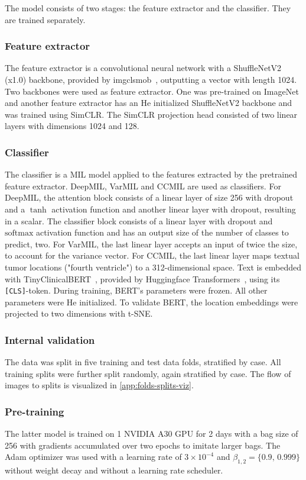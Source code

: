 The model consists of two stages: the feature extractor and the classifier.
They are trained separately.

\subsubsection{Feature extractor}
The feature extractor is a convolutional neural network with a ShuffleNetV2 (x1.0) backbone, provided by imgclsmob~\cite{imgclsmob2023}, outputting a vector with length 1024.
Two backbones were used as feature extractor.
One was pre-trained on ImageNet and another feature extractor has an He initialized ShuffleNetV2 backbone and was trained using SimCLR.
The SimCLR projection head consisted of two linear layers with dimensions 1024 and 128.

\subsubsection{Classifier}
The classifier is a MIL model applied to the features extracted by the pretrained feature extractor.
DeepMIL, VarMIL and CCMIL are used as classifiers.
For DeepMIL, the attention block consists of a linear layer of size 256 with dropout and a $\tanh$ activation function and another linear layer with dropout, resulting in a scalar.
The classifier block consists of a linear layer with dropout and $\mathrm{softmax}$ activation function and has an output size of the number of classes to predict, \ie two.
For VarMIL, the last linear layer accepts an input of twice the size, to account for the variance vector.
For CCMIL, the last linear layer maps textual tumor locations (\eg "fourth ventricle") to a 312-dimensional space.
Text is embedded with TinyClinicalBERT~\cite{Rohanian2023}, provided by Huggingface Transformers~\cite{Wolf2020}, using its \texttt{[CLS]}-token.
During training, BERT's parameters were frozen.
All other parameters were He initialized.
To validate BERT, the location embeddings were projected to two dimensions with t-SNE.

\subsubsection{Internal validation}\label{subsubsec:slicom-folds}
The data was split in five training and test data folds, stratified by case.
All training splits were further split randomly, again stratified by case.
The flow of images to splits is visualized in \cref{app:folds-splits-viz}.

\subsubsection{Pre-training}
The latter model is trained on 1 NVIDIA A30 GPU for 2 days with a bag size of 256 with gradients accumulated over two epochs to imitate larger bags.
The Adam optimizer was used with a learning rate of $3\times 10^{-4}$ and $\beta_{1,2} = \{0.9,\, 0.999\}$ without weight decay and without a learning rate scheduler.

